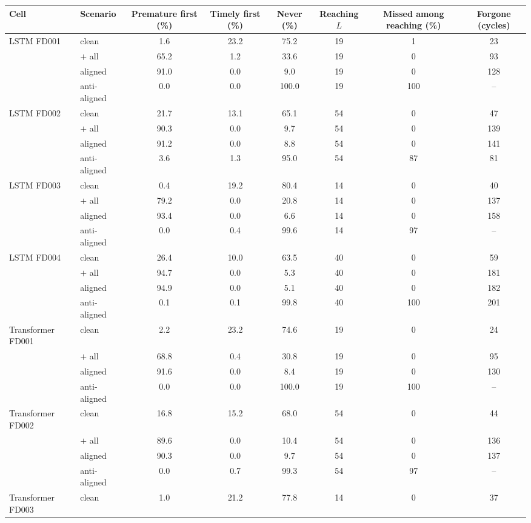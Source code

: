 \begin{tabular}{llcccccc}\toprule
Cell & Scenario & Premature first (\%) & Timely first (\%) & Never (\%) & Reaching $L$ & Missed among reaching (\%) & Forgone (cycles) \\ \midrule
LSTM FD001 & clean & 1.6 & 23.2 & 75.2 & 19 & 1 & 23 \\
 & $+$ all & 65.2 & 1.2 & 33.6 & 19 & 0 & 93 \\
 & aligned & 91.0 & 0.0 & 9.0 & 19 & 0 & 128 \\
 & anti-aligned & 0.0 & 0.0 & 100.0 & 19 & 100 & -- \\
\addlinespace[2pt]
LSTM FD002 & clean & 21.7 & 13.1 & 65.1 & 54 & 0 & 47 \\
 & $+$ all & 90.3 & 0.0 & 9.7 & 54 & 0 & 139 \\
 & aligned & 91.2 & 0.0 & 8.8 & 54 & 0 & 141 \\
 & anti-aligned & 3.6 & 1.3 & 95.0 & 54 & 87 & 81 \\
\addlinespace[2pt]
LSTM FD003 & clean & 0.4 & 19.2 & 80.4 & 14 & 0 & 40 \\
 & $+$ all & 79.2 & 0.0 & 20.8 & 14 & 0 & 137 \\
 & aligned & 93.4 & 0.0 & 6.6 & 14 & 0 & 158 \\
 & anti-aligned & 0.0 & 0.4 & 99.6 & 14 & 97 & -- \\
\addlinespace[2pt]
LSTM FD004 & clean & 26.4 & 10.0 & 63.5 & 40 & 0 & 59 \\
 & $+$ all & 94.7 & 0.0 & 5.3 & 40 & 0 & 181 \\
 & aligned & 94.9 & 0.0 & 5.1 & 40 & 0 & 182 \\
 & anti-aligned & 0.1 & 0.1 & 99.8 & 40 & 100 & 201 \\
\addlinespace[2pt]
Transformer FD001 & clean & 2.2 & 23.2 & 74.6 & 19 & 0 & 24 \\
 & $+$ all & 68.8 & 0.4 & 30.8 & 19 & 0 & 95 \\
 & aligned & 91.6 & 0.0 & 8.4 & 19 & 0 & 130 \\
 & anti-aligned & 0.0 & 0.0 & 100.0 & 19 & 100 & -- \\
\addlinespace[2pt]
Transformer FD002 & clean & 16.8 & 15.2 & 68.0 & 54 & 0 & 44 \\
 & $+$ all & 89.6 & 0.0 & 10.4 & 54 & 0 & 136 \\
 & aligned & 90.3 & 0.0 & 9.7 & 54 & 0 & 137 \\
 & anti-aligned & 0.0 & 0.7 & 99.3 & 54 & 97 & -- \\
\addlinespace[2pt]
Transformer FD003 & clean & 1.0 & 21.2 & 77.8 & 14 & 0 & 37 \\

\end{tabular}
